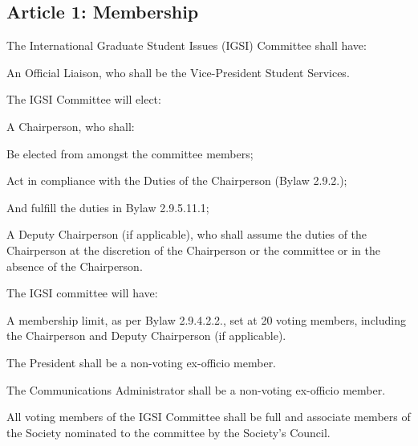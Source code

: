 \subsection{Article 1: Membership}
\begin{longenum}[ label*=\thesubsection.\arabic*., align=left] 
\item The International Graduate Student Issues (IGSI) Committee shall have:
	\begin{longenum}[ label*=\arabic*., align=left]
	\item An Official Liaison, who shall be the Vice-President Student Services.
	\end{longenum}
\item The IGSI Committee will elect:
	\begin{longenum}[ label*=\arabic*., align=left]
	\item A Chairperson, who shall:
		\begin{longenum}[ label*=\arabic*., align=left]
		\item Be elected from amongst the committee members;
		\item Act in compliance with the Duties of the Chairperson (Bylaw 2.9.2.);
		\item And fulfill the duties in Bylaw 2.9.5.11.1;
		\end{longenum}
	\item A Deputy Chairperson (if applicable), who shall assume the duties of the Chairperson at the discretion of the Chairperson or the committee or in the absence of the Chairperson.
	\end{longenum}
\item The IGSI committee will have:
	\begin{longenum}[ label*=\arabic*., align=left]
	\item A membership limit, as per Bylaw 2.9.4.2.2., set at 20 voting members, including the Chairperson and Deputy Chairperson (if applicable).
	\end{longenum}
\item The President shall be a non-voting ex-officio member.
\item The Communications Administrator shall be a non-voting ex-officio member.
\item All voting members of the IGSI Committee shall be full and associate members of the Society nominated to the committee by the Society’s Council.     
\end{longenum}

